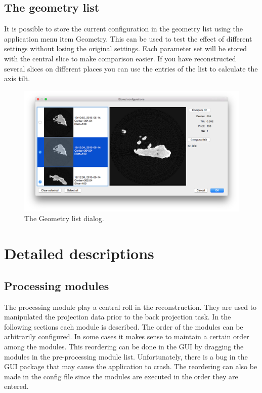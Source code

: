 \documentclass[a4paper]{scrreprt}
\begin{document}
\section{The geometry list}
It is possible to store the current configuration in the geometry list using the application menu item Geometry. This can be used to test the effect of different settings without losing the original settings. Each parameter set will be stored with the central slice to make comparison easier. If you have reconstructed several slices on different places you can use the entries of the list to calculate the axis tilt. 
\begin{figure}[ht!]
\centering
\includegraphics[scale=0.4]{figures/GeometryListDlg.png}
\caption{The Geometry list dialog.}
\end{figure}


\chapter{Detailed descriptions}
\section{Processing modules}
The processing module play a central roll in the reconstruction. They are used
to manipulated the projection data prior to the back projection task. In the
following sections each module is described. The order of the modules can be
arbitrarily configured. In some cases it makes sense to maintain a certain
order among the modules. This reordering can be done in the GUI by dragging the
modules in the pre-processing module list. Unfortunately, there is a bug in the
GUI package that may cause the application to crash. The reordering can also be
made in the config file since the modules are executed in the order they are
entered.
\end{document}
